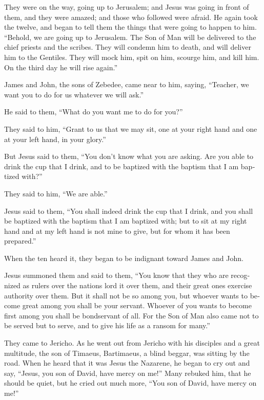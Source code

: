\begin{paracol}{2}
\begin{otherlanguage}{english}
 They were on the way, going up to Jerusalem; and Jesus
was going in front of them, and they were amazed; and those who followed
were afraid. He again took the twelve, and began to tell them the things
that were going to happen to him.  ``Behold, we are going
up to Jerusalem. The Son of Man will be delivered to the chief priests
and the scribes. They will condemn him to death, and will deliver him to
the Gentiles.  They will mock him, spit on him, scourge
him, and kill him. On the third day he will rise again.''

 James and John, the sons of Zebedee, came near to him,
saying, ``Teacher, we want you to do for us whatever we will ask.''

 He said to them, ``What do you want me to do for you?''

 They said to him, ``Grant to us that we may sit, one at
your right hand and one at your left hand, in your glory.''

 But Jesus said to them, ``You don't know what you are
asking. Are you able to drink the cup that I drink, and to be baptized
with the baptism that I am baptized with?''

 They said to him, ``We are able.''

Jesus said to them, ``You shall indeed drink the cup that I drink, and
you shall be baptized with the baptism that I am baptized with;
 but to sit at my right hand and at my left hand is not
mine to give, but for whom it has been prepared.''

 When the ten heard it, they began to be indignant toward
James and John.

 Jesus summoned them and said to them, ``You know that
they who are recognized as rulers over the nations lord it over them,
and their great ones exercise authority over them.  But
it shall not be so among you, but whoever wants to become great among
you shall be your servant.  Whoever of you wants to
become first among you shall be bondservant of all.  For
the Son of Man also came not to be served but to serve, and to give his
life as a ransom for many.''

 They came to Jericho. As he went out from Jericho with
his disciples and a great multitude, the son of Timaeus, Bartimaeus, a
blind beggar, was sitting by the road.  When he heard
that it was Jesus the Nazarene, he began to cry out and say, ``Jesus,
you son of David, have mercy on me!''  Many rebuked him,
that he should be quiet, but he cried out much more, ``You son of David,
have mercy on me!''


\end{otherlanguage}
\end{paracol}
